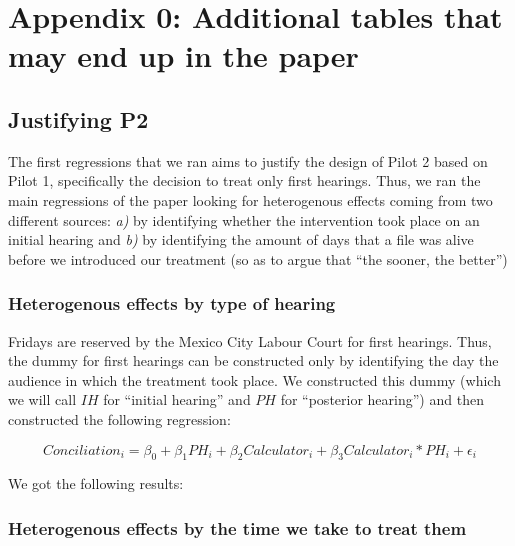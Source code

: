 \section*{Appendix 0: Additional tables that may end up in the paper}
\label{appendix_a}

\subsection{Justifying P2}

The first regressions that we ran aims to justify the design of Pilot 2 based on Pilot 1, specifically the decision to treat only first hearings. Thus, we ran the main regressions of the paper looking for heterogenous effects coming from two different sources: \textit{a)} by identifying whether the intervention took place on an initial hearing and \textit{b)} by identifying the amount of days that a file was alive before we introduced our treatment (so as to argue that ``the sooner, the better'')

\subsubsection{Heterogenous effects by type of hearing}

Fridays are reserved by the Mexico City Labour Court for first hearings. Thus, the dummy for first hearings can be constructed only by identifying the day the audience in which the treatment took place. We constructed this dummy (which we will call $IH$ for ``initial hearing'' and $PH$ for ``posterior hearing'') and then constructed the following regression: 

\begin{equation}
    Conciliation_{i} = \beta_0 + \beta_1 PH_i + \beta_2 Calculator_i + \beta_3 Calculator_i *PH_i + \epsilon_i 
\end{equation}

We got the following results: 

\FloatBarrier

\begin{centering}
\begin{table}[!ht]
    \caption{Immediate expectation updating}
    \label{exp_updating}
    \scriptsize{}
\end{table}
\end{centering}


\FloatBarrier


\subsubsection{Heterogenous effects by the time we take to treat them}

